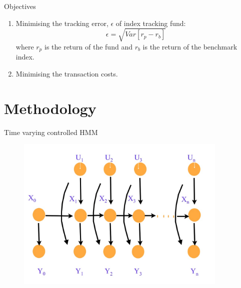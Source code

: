 \documentclass[handout]{beamer}
\begin{document}
\begin{frame}{Objectives}
\begin{enumerate}
\item Minimising the tracking error, $\epsilon$ of index tracking fund:
\begin{equation*}
\epsilon = \sqrt{Var[r_p - r_b]}
\end{equation*}
where $r_p$ is the return of the fund and $r_b$ is the return of the benchmark index.
\item Minimising the transaction costs.
\end{enumerate}
\end{frame}

\section{Methodology}


\begin{frame}{Time varying controlled HMM}
  \begin{figure}
    \centering
    \includegraphics[width = 0.9\textwidth]{figures/hmm.jpg}
  \end{figure}
\end{frame}
\end{document}
